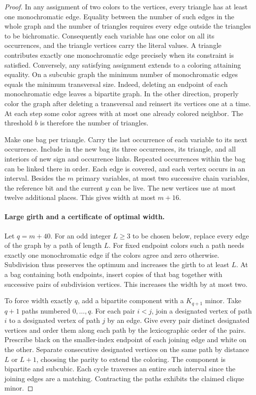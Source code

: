\documentclass[11pt]{article}
\begin{document}
\begin{proof}
In any assignment of two colors to the vertices, every triangle has
at least one monochromatic edge. Equality between the number of such
edges in the whole graph and the number of triangles requires every
edge outside the triangles to be bichromatic. Consequently each variable
has one color on all its occurrences, and the triangle vertices carry the
literal values. A triangle contributes exactly one monochromatic edge
precisely when its constraint is satisfied. Conversely, any satisfying
assignment extends to a coloring attaining equality.
On a subcubic graph the minimum number of monochromatic edges equals
the minimum transversal size. Indeed, deleting an endpoint of each
monochromatic edge leaves a bipartite graph. In the other direction,
properly color the graph after deleting a transversal and reinsert its
vertices one at a time. At each step some color agrees with at most one
already colored neighbor. The threshold \(b\) is therefore the number of
triangles.

Make one bag per triangle. Carry the last occurrence of each variable
to its next occurrence. Include in the new bag its three occurrences,
its triangle, and all interiors of new sign and occurrence links.
Repeated occurrences within the bag can be linked there in order.
Each edge is covered, and each vertex occurs in an interval. Besides
the \(m\) primary variables, at most two successive chain variables,
the reference bit and the current \(y\) can be live. The new vertices
use at most twelve additional places. This gives width at most \(m+16\).

\paragraph{Large girth and a certificate of optimal width.}
Let \(q=m+40\). For an odd integer \(L\ge3\) to be chosen below,
replace every edge of the graph by a path of length \(L\). For fixed
endpoint colors such a path needs exactly one monochromatic edge if
the colors agree and zero otherwise. Subdivision thus preserves the
optimum and increases the girth to at least \(L\). At a bag containing
both endpoints, insert copies of that bag together with successive
pairs of subdivision vertices. This increases the width by at most two.

To force width exactly \(q\), add a bipartite component with a
\(K_{q+1}\) minor. Take \(q+1\) paths numbered \(0,\ldots,q\).
For each pair \(i<j\), join a designated vertex of path \(i\) to a
designated vertex of path \(j\) by an edge. Give every pair distinct
designated vertices and order them along each path by the lexicographic
order of the pairs. Prescribe black on the smaller-index endpoint of
each joining edge and white on the other. Separate consecutive designated
vertices on the same path by distance \(L\) or \(L+1\), choosing the parity
to extend the coloring. The component is bipartite and subcubic. Each
cycle traverses an entire such interval since the joining edges are a
matching. Contracting the paths exhibits the claimed clique minor.


\end{proof}
\end{document}
